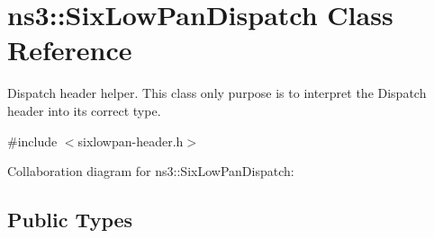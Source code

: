 \hypertarget{classns3_1_1SixLowPanDispatch}{}\section{ns3\+:\+:Six\+Low\+Pan\+Dispatch Class Reference}
\label{classns3_1_1SixLowPanDispatch}


Dispatch header helper. This class only purpose is to interpret the Dispatch header into its correct type.  




{\ttfamily \#include $<$sixlowpan-\/header.\+h$>$}



Collaboration diagram for ns3\+:\+:Six\+Low\+Pan\+Dispatch\+:
\subsection*{Public Types}
